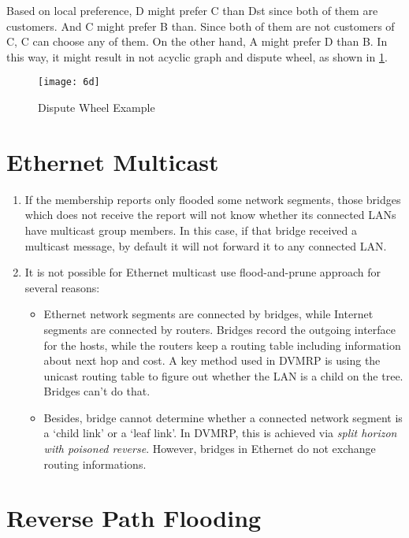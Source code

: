 \documentclass[12pt,titlepage,letterpaper]{article}
\begin{document}
Based on local preference, D might prefer C than Dst since both of them are
customers. And C might prefer B than. Since both of them are not customers
of C, C can choose any of them. On the other hand, A might prefer D than B.
In this way, it might result in not acyclic graph and dispute wheel, as shown
in \cref{6d}.
\begin{figure}[H]
    \centering
    \caption{Dispute Wheel Example}\label{6d}
    \texttt{[image: 6d]}
\end{figure}

\section{Ethernet Multicast}
\begin{enumerate}[label=\bfseries\alph*)]
    \item If the membership reports only flooded some network segments, those
        bridges which does not receive the report will not know whether its
        connected LANs have multicast group members. In this case, if that
        bridge received a multicast message, by default it will not forward it
        to any connected LAN.
    \item It is not possible for Ethernet multicast use flood-and-prune
        approach for several reasons:
        \begin{itemize}[label=-]
            \item Ethernet network segments are connected by bridges, while
                Internet segments are connected by routers. Bridges record the
                outgoing interface for the hosts, while the routers keep a
                routing table including information about next hop and cost.
                A key method used in DVMRP is using the unicast routing table
                to figure out whether the LAN is a child on the tree. Bridges
                can't do that.
            \item Besides, bridge cannot determine whether a connected network
                segment is a `child link' or a `leaf link'. In DVMRP, this is
                achieved via \emph{split horizon with poisoned reverse}.
                However, bridges in Ethernet do not exchange routing
                informations.
        \end{itemize}
\end{enumerate}

\section{Reverse Path Flooding}
\end{document}
